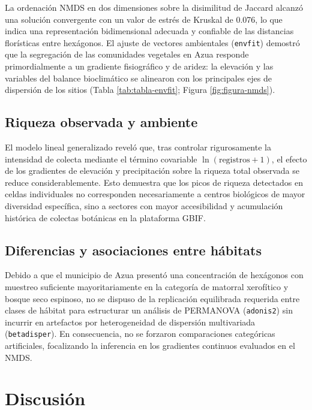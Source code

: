 \documentclass[
  12pt,
  man,
  floatsintext]{apa7}
\begin{document}
La ordenación NMDS en dos dimensiones sobre la disimilitud de Jaccard alcanzó una solución convergente con un valor de estrés de Kruskal de 0.076, lo que indica una representación bidimensional adecuada y confiable de las distancias florísticas entre hexágonos. El ajuste de vectores ambientales (\texttt{envfit}) demostró que la segregación de las comunidades vegetales en Azua responde primordialmente a un gradiente fisiográfico y de aridez: la elevación y las variables del balance bioclimático se alinearon con los principales ejes de dispersión de los sitios (Tabla \ref{tab:tabla-envfit}; Figura \ref{fig:figura-nmds}).

\subsection{Riqueza observada y ambiente}\label{riqueza-observada-y-ambiente}

El modelo lineal generalizado reveló que, tras controlar rigurosamente la intensidad de colecta mediante el término covariable \(\ln(\text{registros} + 1)\), el efecto de los gradientes de elevación y precipitación sobre la riqueza total observada se reduce considerablemente. Esto demuestra que los picos de riqueza detectados en celdas individuales no corresponden necesariamente a centros biológicos de mayor diversidad específica, sino a sectores con mayor accesibilidad y acumulación histórica de colectas botánicas en la plataforma GBIF.

\subsection{Diferencias y asociaciones entre hábitats}\label{diferencias-y-asociaciones-entre-huxe1bitats}

Debido a que el municipio de Azua presentó una concentración de hexágonos con muestreo suficiente mayoritariamente en la categoría de matorral xerofítico y bosque seco espinoso, no se dispuso de la replicación equilibrada requerida entre clases de hábitat para estructurar un análisis de PERMANOVA (\texttt{adonis2}) sin incurrir en artefactos por heterogeneidad de dispersión multivariada (\texttt{betadisper}). En consecuencia, no se forzaron comparaciones categóricas artificiales, focalizando la inferencia en los gradientes continuos evaluados en el NMDS.

\section{Discusión}\label{discusiuxf3n}
\end{document}
